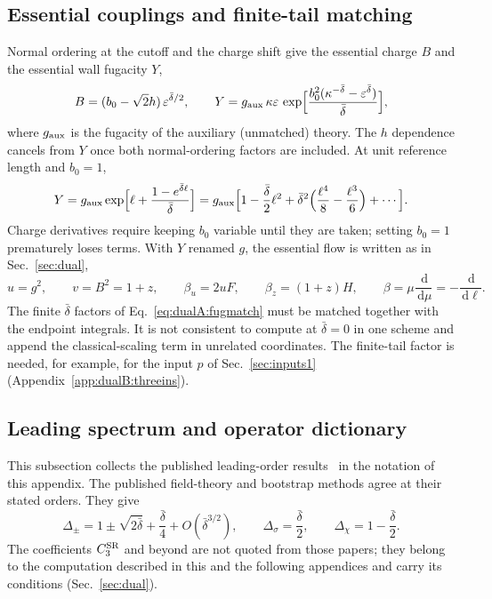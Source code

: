 \documentclass[11pt,a4paper]{article}
\numberwithin{equation}{section}
\newcommand{\dd}{\,\mathrm d}
\newcommand{\Ds}{\Delta_\sigma}
\newcommand{\CSR}{C^{\rm SR}}
\newcommand{\db}{\bar\delta}
\begin{document}
\subsection{Essential couplings and finite-tail matching}\label{app:dualA:matching}
Normal ordering at the cutoff and the charge shift give the essential charge $B$ and the essential wall fugacity
$Y$,
\begin{equation}
 B=(b_0-\sqrt2h)\,\varepsilon^{\db/2},\qquad
 Y=g_{\rm aux}\,\kappa\varepsilon\,\exp\Bigl[\frac{b_0^2(\kappa^{-\db}-\varepsilon^{\db})}{\db}\Bigr],
 \label{eq:dualA:matching}
\end{equation}
where $g_{\rm aux}$ is the fugacity of the auxiliary (unmatched) theory. The $h$ dependence cancels from $Y$ once
both normal-ordering factors are included. At unit reference length and $b_0=1$,
\begin{equation}
 Y=g_{\rm aux}\exp\Bigl[\ell+\frac{1-e^{\db\ell}}{\db}\Bigr]
 =g_{\rm aux}\Bigl[1-\frac{\db}{2}\ell^2+\db^2\Bigl(\frac{\ell^4}{8}-\frac{\ell^3}{6}\Bigr)+\cdots\Bigr].
 \label{eq:dualA:fugmatch}
\end{equation}
Charge derivatives require keeping $b_0$ variable until they are taken; setting $b_0=1$ prematurely loses terms.
With $Y$ renamed $g$, the essential flow is written as in Sec.~\ref{sec:dual},
\begin{equation}
 u=g^2,\qquad v=B^2=1+z,\qquad \beta_u=2uF,\qquad \beta_z=(1+z)H,\qquad
 \beta=\mu\frac{\dd}{\dd\mu}=-\frac{\dd}{\dd\ell}.
 \label{eq:dualA:essential}
\end{equation}
The finite $\db$ factors of Eq.~\eqref{eq:dualA:fugmatch} must be matched together with the endpoint integrals. It
is not consistent to compute at $\db=0$ in one scheme and append the classical-scaling term in unrelated coordinates. The
finite-tail factor is needed, for example, for the input $p$ of Sec.~\ref{sec:inputs1} (Appendix~\ref{app:dualB:threeins}).

\subsection{Leading spectrum and operator dictionary}\label{app:dualA:dictionary}
This subsection collects the published leading-order results~\cite{Benedetti:2024wgx,Benedetti:2025nzp} in the
notation of this appendix. The published field-theory and bootstrap methods agree at their stated orders. They give
\begin{equation}
 \Delta_\pm=1\pm\sqrt{2\db}+\frac{\db}{4}+O(\db^{3/2}),\qquad \Ds=\frac{\db}{2},\qquad \Delta_\chi=1-\frac{\db}{2}.
 \label{eq:dualA:published}
\end{equation}
The coefficients $\CSR_3$ and beyond are not quoted from those papers; they belong to the computation described in
this and the following appendices and carry its conditions (Sec.~\ref{sec:dual}).
\end{document}
